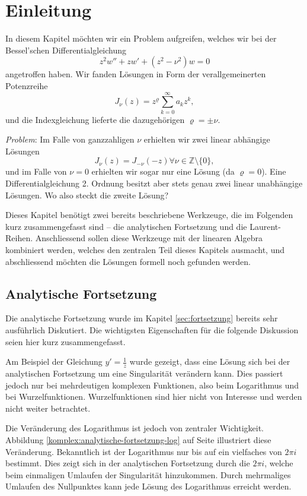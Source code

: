 \section{Einleitung}

In diesem Kapitel möchten wir ein Problem aufgreifen, welches wir bei der Bessel'schen Differentialgleichung
$$ z^2w''+zw'+(z^2 - \nu^2)w=0$$
angetroffen haben. Wir fanden Lösungen in Form der verallgemeinerten Potenzreihe
$$J_\nu(z)=z^\varrho\sum_{k=0}^{\infty}a_kz^k,$$
und die Indexgleichung lieferte die dazugehörigen $\varrho=\pm\nu.$

\emph{Problem}: Im Falle von ganzzahligen $\nu$ erhielten wir zwei linear abhängige Lösungen $$J_\nu(z) = J_{-\nu}(-z)\forall\nu\in\mathbb{Z}\setminus\{0\},$$
und im Falle von $\nu=0$ erhielten wir sogar nur eine Lösung (da $\varrho=0$). Eine Differentialgleichung 2. Ordnung besitzt aber stets genau zwei linear unabhängige Lösungen. Wo also steckt die zweite Lösung?

Dieses Kapitel benötigt zwei bereits beschriebene Werkzeuge, die im Folgenden kurz zusammengefasst sind -- die analytischen Fortsetzung und die Laurent-Reihen. Anschliessend sollen diese Werkzeuge mit der linearen Algebra kombiniert werden, welches den zentralen Teil dieses Kapitels ausmacht, und abschliessend möchten die Lösungen formell noch gefunden werden.

\subsection{Analytische Fortsetzung}
Die analytische Fortsetzung wurde im Kapitel \ref{sec:fortsetzung} bereits sehr ausführlich Diskutiert. Die wichtigsten Eigenschaften für die folgende Diskussion seien hier kurz zusammengefasst.

Am Beispiel der Gleichung $y'=\frac{1}{z}$ wurde gezeigt, dass eine Lösung sich bei der analytischen Fortsetzung um eine Singularität verändern kann. Dies passiert jedoch nur bei mehrdeutigen komplexen Funktionen, also beim Logarithmus und bei Wurzelfunktionen. Wurzelfunktionen sind hier nicht von Interesse und werden nicht weiter betrachtet. 

Die Veränderung des Logarithmus ist jedoch von zentraler Wichtigkeit. Abbildung \ref{komplex:analytische-fortsetzung-log} auf Seite \pageref{komplex:analytische-fortsetzung-log} illustriert diese Veränderung. Bekanntlich ist der Logarithmus nur bis auf ein vielfaches von $2\pi i$ bestimmt. Dies zeigt sich in der analytischen Fortsetzung durch die $2\pi i$, welche beim einmaligen Umlaufen der Singularität hinzukommen. Durch mehrmaliges Umlaufen des Nullpunktes kann jede Lösung des Logarithmus erreicht werden.

